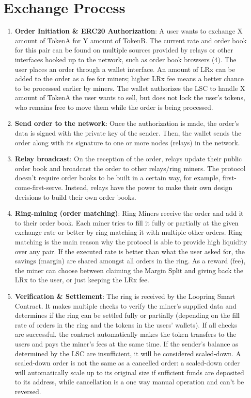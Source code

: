 \documentclass[UTF8,nofonts]{article}
\begin{document}
\section{Exchange Process}
\begin{enumerate} 

\item \textbf{Order Initiation \& ERC20 Authorization}: A user wants to exchange X amount of TokenA for Y amount of TokenB. The current rate and order book for this pair can be found on multiple sources provided by relays or other interfaces hooked up to the network, such as order book browsers (4). The user places an order through a wallet interface. An amount of LRx can be added to the order as a fee for miners; higher LRx fee means a better chance to be processed earlier by miners. The wallet authorizes the LSC to handle X amount of TokenA the user wants to sell, but does not lock the user's tokens, who remains free to move them while the order is being processed.

\item \textbf{Send order to the network}: Once the authorization is made, the order's data is signed with the private key of the sender. Then, the wallet sends the order along with its signature to one or more nodes (relays) in the network.
\item \textbf{Relay broadcast}: On the reception of the order, relays update their public order book and broadcast the order to other relays/ring miners. The protocol doesn't require order books to be built in a certain way, for example, first-come-first-serve. Instead, relays have the power to make their own design decisions to build their own order books.
\item \textbf{Ring-mining (order matching)}: Ring Miners receive the order and add it to their order book. Each miner tries to fill it fully or partially at the given exchange rate or better by ring-matching it with multiple other orders. Ring-matching is the main reason why the protocol is able to provide high liquidity over any pair. If the executed rate is better than what the user asked for, the savings (margin) are shared amongst all orders in the ring. As a reward (fee), the miner can choose between claiming the Margin Split and giving back the LRx to the user, or just keeping the LRx fee.
\item \textbf{Verification \& Settlement}: The ring is received by the Loopring Smart Contract. It makes multiple checks to verify the miner's supplied data and determines if the ring can be settled fully or partially (depending on the fill rate of orders in the ring and the tokens in the users' wallets). If all checks are successful, the contract automatically makes the token transfers to the users and pays the miner's fees at the same time. If the sender's balance as determined by the LSC are insufficient, it will be considered scaled-down. A scaled-down order is not the same as a cancelled order: a scaled-down order will automatically scale up to its original size if sufficient funds are deposited to its address, while cancellation is a one way manual operation and can't be reversed.

\end{enumerate}
\end{document}
